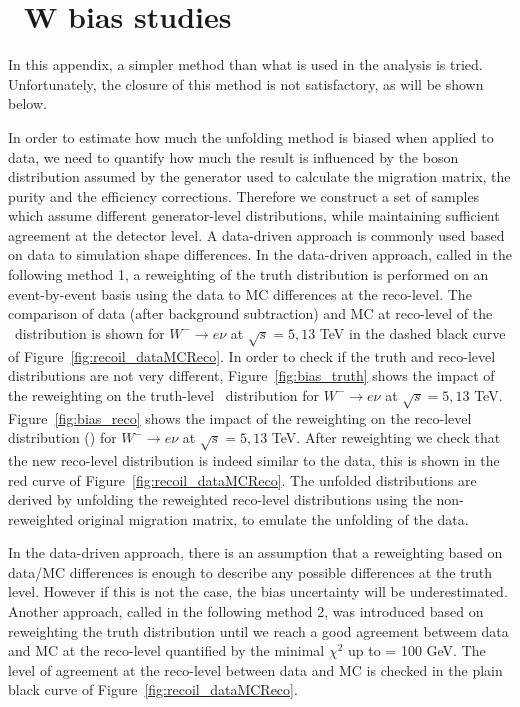 \section{\pt\ W bias studies}
\label{sec:wpt_bias}
In this appendix, a simpler method than what is used in the analysis is tried. Unfortunately, the closure of this method is not satisfactory, as will be shown below.

In order to estimate how much the unfolding method is biased when applied to data, we need to quantify how much the result is influenced by the boson \pT distribution assumed by the generator used to calculate the migration matrix, the purity and the efficiency corrections. Therefore we construct a set of samples which assume different generator-level \pT distributions, while maintaining sufficient agreement at the detector level. A data-driven approach is commonly used based on data to simulation shape differences. In the data-driven approach, called in the following method 1, a reweighting of the truth distribution is performed on an event-by-event basis using the data to MC differences at the reco-level. The comparison of data (after background subtraction) and MC at reco-level of the \ut\ distribution is shown for $W^{-}\rightarrow e\nu$ at $\sqrt{s}=5, 13$ TeV in the dashed black curve of Figure~\ref{fig:recoil_dataMCReco}.
In order to check if the truth and reco-level distributions are not very different, Figure~\ref{fig:bias_truth} shows the impact of the reweighting on the truth-level \ptw\ distribution for $W^{-}\rightarrow e\nu$ at $\sqrt{s}=5, 13$ TeV. Figure~\ref{fig:bias_reco} shows the impact of the reweighting on the reco-level distribution (\ut) for $W^{-}\rightarrow e\nu$ at $\sqrt{s}=5, 13$ TeV. After reweighting we check that the new reco-level distribution is indeed similar to the data, this is shown in the red curve of Figure~\ref{fig:recoil_dataMCReco}. The unfolded distributions are derived by unfolding the reweighted reco-level distributions using the non-reweighted original migration matrix, to emulate the unfolding of the data.

In the data-driven approach, there is an assumption that a reweighting based on data/MC differences is enough to describe any possible differences at the truth level. However if this is not the case, the bias uncertainty will be underestimated. Another approach, called in the following method 2, was introduced based on reweighting the truth distribution until we reach a good agreement betweem data and MC at the reco-level quantified by the minimal $\chi^{2}$ up to \ut = 100 GeV. The level of agreement at the reco-level between data and MC is checked in the plain black curve of Figure~\ref{fig:recoil_dataMCReco}.

